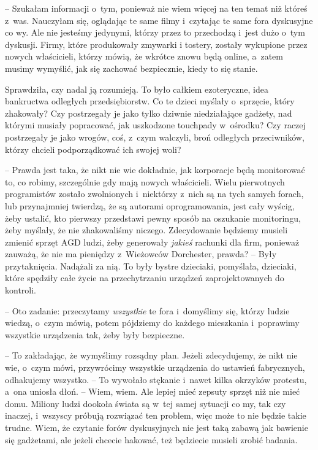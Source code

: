 \documentclass[oneside,polish,11pt,sfheadings]{mwbk}
\begin{document}
-- Szukałam informacji o~tym, ponieważ nie wiem więcej na ten temat niż
któreś z~was. Nauczyłam się, oglądając te same filmy i~czytając te same
fora dyskusyjne co wy. Ale nie jesteśmy jedynymi, którzy przez to
przechodzą i~jest dużo o~tym dyskusji. Firmy, które produkowały zmywarki
i tostery, zostały wykupione przez nowych właścicieli, którzy mówią, że
wkrótce znowu będą online, a~zatem musimy wymyślić, jak się zachować
bezpiecznie, kiedy to się stanie.

Sprawdziła, czy nadal ją rozumieją. To było całkiem ezoteryczne, idea
bankructwa odległych przedsiębiorstw. Co te dzieci myślały o~sprzęcie,
który zhakowały? Czy postrzegały je jako tylko dziwnie niedziałające
gadżety, nad którymi musiały popracować, jak uszkodzone touchpady w~ośrodku? Czy raczej postrzegały je jako wrogów, coś, z~czym walczyli,
broń odległych przeciwników, którzy chcieli podporządkować ich swojej
woli?

-- Prawda jest taka, że nikt nie wie dokładnie, jak korporacje będą
monitorować to, co robimy, szczególnie gdy mają nowych właścicieli.
Wielu pierwotnych programistów zostało zwolnionych i~niektórzy z~nich są
na tych samych forach, lub przynajmniej twierdzą, że są autorami
oprogramowania, jest cały wyścig, żeby ustalić, kto pierwszy przedstawi
pewny sposób na oszukanie monitoringu, żeby myślały, że nie zhakowaliśmy
niczego. Zdecydowanie będziemy musieli zmienić sprzęt AGD ludzi, żeby
generowały \textit{jakieś} rachunki dla firm, ponieważ zauważą, że nie ma
pieniędzy z~Wieżowców Dorchester, prawda? -- Były przytaknięcia. Nadążali
za nią. To były bystre dzieciaki, pomyślała, dzieciaki, które spędziły
całe życie na przechytrzaniu urządzeń zaprojektowanych do kontroli.

-- Oto zadanie: przeczytamy \textit{wszystkie} te fora i~domyślimy się,
którzy ludzie wiedzą, o~czym mówią, potem pójdziemy do każdego
mieszkania i~poprawimy wszystkie urządzenia tak, żeby były bezpieczne.

-- To zakładając, że wymyślimy rozsądny plan. Jeżeli zdecydujemy, że nikt
nie wie, o~czym mówi, przywrócimy wszystkie urządzenia do ustawień
fabrycznych, odhakujemy wszystko. -- To wywołało stękanie i~nawet kilka
okrzyków protestu, a~ona uniosła dłoń. -- Wiem, wiem. Ale lepiej mieć
zepsuty sprzęt niż nie mieć domu. Miliony ludzi dookoła świata są w~tej
samej sytuacji co my, tak czy inaczej, i~wszyscy próbują rozwiązać ten
problem, więc może to nie będzie takie trudne. Wiem, że czytanie forów
dyskusyjnych nie jest taką zabawą jak bawienie się gadżetami, ale jeżeli
chcecie hakować, też będziecie musieli zrobić badania.
\end{document}
